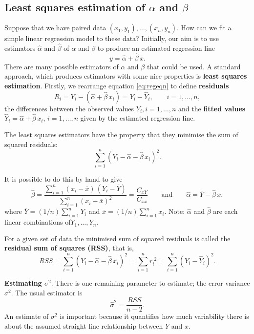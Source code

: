 \documentclass[
  british,
  11pt,
  openany, a4paper]{book}
\begin{document}
\subsection{\texorpdfstring{Least squares estimation of \(\alpha\) and \(\beta\)}{Least squares estimation of \textbackslash alpha and \textbackslash beta}}\label{olsestimators}

Suppose that we have paired data \((x_1,y_1), \ldots, (x_n,y_n)\). How can we fit a simple linear regression model to these data? Initially, our aim is to use estimators \(\hat{\alpha}\) and \(\hat{\beta}\) of \(\alpha\) and \(\beta\) to produce an estimated regression line
\[ y= \hat{\alpha}+\hat{\beta}\,x. \]
There are many possible estimators of \(\alpha\) and \(\beta\) that could be used. A standard approach, which produces estimators with some nice properties is \textbf{least squares estimation}. Firstly, we rearrange equation \eqref{eq:regeqn} to define \textbf{residuals}
\[ R_i = Y_i-(\hat{\alpha}+\hat{\beta}\,x_i) = Y_i-\hat{Y}_i, \qquad i=1,\ldots,n, \]
the differences between the observed values \(Y_i, i = 1, \ldots, n\) and the \textbf{fitted values} \(\hat{Y}_i=\hat{\alpha}+\hat{\beta}\,x_i\), \(i = 1, \ldots, n\) given by the estimated regression line.

The least squares estimators have the property that they minimise the sum of squared residuals:
\[ \sum_{i=1}^n \left(Y_i-\hat{\alpha}-\hat{\beta}\,x_i\right)^2. \]

It is possible to do this by hand to give
\begin{equation}
\hat{\beta}=\frac{\displaystyle\sum_{i=1}^n \left(x_i- \overline{x}\right)\,\left(Y_i- \overline{Y}\right)}
{\displaystyle\sum_{i=1}^n \left(x_i- \overline{x}\right)^2} = \frac{C_{xY}}{C_{xx}} \qquad
\text{and} \qquad  
\hat{\alpha}=  \overline{Y} - \hat{\beta}\, \overline{x}, 
\end{equation}
where \(\overline{Y} = (1/n)\sum_{i=1}^n Y_i\) and \(\overline{x} = (1/n)\sum_{i=1}^n x_i\). Note: \(\hat{\alpha}\) and \(\hat{\beta}\) are each linear combinations of\(Y_1,\ldots,Y_n\).

For a given set of data the minimised sum of squared residuals is called the \textbf{residual sum of squares (RSS)}, that is,
\[ RSS = \sum_{i=1}^n \left(Y_i-\hat{\alpha}-\hat{\beta}\,x_i\right)^2 = \sum_{i=1}^n r_i^{\,\,2} 
= \sum_{i=1}^n \left(Y_i-\hat{Y}_i\right)^2. \]

\textbf{Estimating \(\sigma^2\)}. There is one remaining parameter to estimate; the error variance \(\sigma^2\). The usual estimator is
\begin{equation}
\hat{\sigma}^2 = \frac{RSS}{n-2}.
\end{equation}
An estimate of \(\sigma^2\) is important because it quantifies how much variability there is about the assumed straight line relationship between \(Y\) and \(x\).
\end{document}
